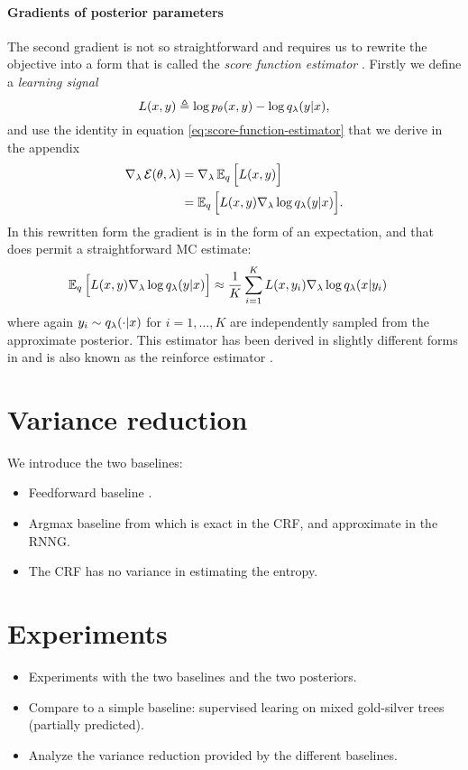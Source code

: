 \paragraph{Gradients of posterior parameters}
The second gradient is not so straightforward and requires us to rewrite the objective into a form that is called the \textit{score function estimator} \citep{fu2006gradient}. Firstly we define a \textit{learning signal}
\begin{equation}
  L(x, y) \triangleq \log p_{\theta}(x, y) - \log q_{\lambda}(y | x),
\end{equation}
and use the identity in equation \ref{eq:score-function-estimator} that we derive in the appendix
\begin{align*}
  \nabla_{\lambda} \operatorname{\mathcal{E}}(\theta, \lambda)
    &= \nabla_{\lambda} \operatorname{\mathbb{E}}_{q} \Big[ L(x, y) \Big] \\
    &= \operatorname{\mathbb{E}}_{q} \Big[ L(x, y) \nabla_{\lambda} \log q_{\lambda}(y | x) \Big].
\end{align*}
In this rewritten form the gradient is in the form of an expectation, and that does permit a straightforward MC estimate:
\begin{align}
    \operatorname{\mathbb{E}}_{q} \Big[ L(x, y) \nabla_{\lambda} \log q_{\lambda}(y | x) \Big]
        &\approx \frac{1}{K}\sum_{i=1}^K  L(x, y_i)\nabla_{\lambda} \log q_{\lambda}(x | y_i)
\end{align}
where again $y_i \sim q_{\lambda}(\cdot | x)$ for $i=1,\dots,K$ are independently sampled from the approximate posterior. This estimator has been derived in slightly different forms in \citet{williams1992reinforce,paisley2012viss,mnih2014nvil,ranganath2014black,miao2016discrete} and is also known as the reinforce estimator \citep{williams1992reinforce}.


\section{Variance reduction}
We introduce the two baselines:
\begin{itemize}
  \item Feedforward baseline \citep{miao2016discrete}.
  \item Argmax baseline from \citet{rennie2017argmax} which is exact in the CRF, and approximate in the RNNG.
  \item The CRF has no variance in estimating the entropy.
\end{itemize}


\section{Experiments}
\begin{itemize}
  \item Experiments with the two baselines and the two posteriors.
  \item Compare to a simple baseline: supervised learing on mixed gold-silver trees (partially predicted).
  \item Analyze the variance reduction provided by the different baselines.
\end{itemize}


